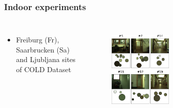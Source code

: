 \frame
{
	\frametitle{Indoor experiments}
	

	\begin{columns}[T]
		
		\small
		\begin{itemize}
			\item Freiburg (Fr), Saarbrucken (Sa) and Ljubljana sites of COLD Dataset
		\end{itemize}
		\centering
		\begin{figure}[p]
			\centering
			\vspace{-0.5cm}
			\includegraphics[width = 0.45\textwidth]{img/icsc/ssg-eval2}
			\label{fig:fr_ssg}
		\end{figure}
				

\end{columns}}
